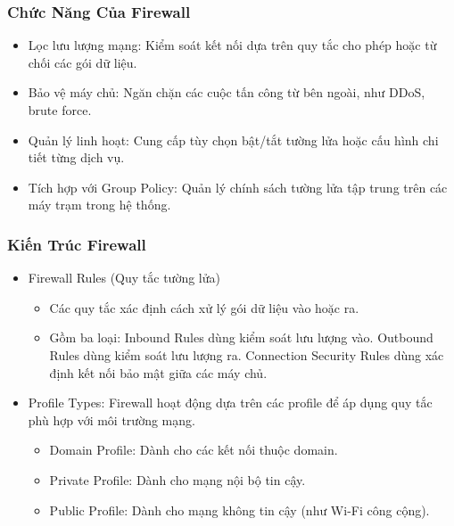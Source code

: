 \documentclass[13pt]{article}
\begin{document}
                \subsubsection{Chức Năng Của Firewall}
                \begin{itemize}
                \item Lọc lưu lượng mạng: Kiểm soát kết nối dựa trên quy tắc cho phép hoặc từ chối các gói dữ liệu.
                \item Bảo vệ máy chủ: Ngăn chặn các cuộc tấn công từ bên ngoài, như DDoS, brute force.
                \item Quản lý linh hoạt: Cung cấp tùy chọn bật/tắt tường lửa hoặc cấu hình chi tiết từng dịch vụ.
                \item Tích hợp với Group Policy: Quản lý chính sách tường lửa tập trung trên các máy trạm trong hệ thống.
                
                \end{itemize}

                \subsubsection{Kiến Trúc Firewall}
                \begin{itemize}
                \item Firewall Rules (Quy tắc tường lửa)
                    \begin{itemize}
                        \item Các quy tắc xác định cách xử lý gói dữ liệu vào hoặc ra.
                        \item Gồm ba loại: Inbound Rules dùng kiểm soát lưu lượng vào. Outbound Rules dùng kiểm soát lưu lượng ra. Connection Security Rules dùng xác định kết nối bảo mật giữa các máy chủ.
                    \end{itemize}
                
                \item Profile Types: Firewall hoạt động dựa trên các profile để áp dụng quy tắc phù hợp với môi trường mạng.
                    \begin{itemize}
                        \item Domain Profile: Dành cho các kết nối thuộc domain.
                        \item Private Profile: Dành cho mạng nội bộ tin cậy.
                        \item Public Profile: Dành cho mạng không tin cậy (như Wi-Fi công cộng).
                    \end{itemize}
                
                \end{itemize}
\end{document}
